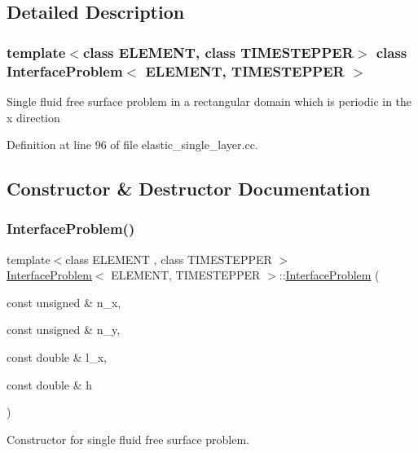 \subsection{Detailed Description}
\subsubsection*{template$<$class E\+L\+E\+M\+E\+NT, class T\+I\+M\+E\+S\+T\+E\+P\+P\+ER$>$\newline
class Interface\+Problem$<$ E\+L\+E\+M\+E\+N\+T, T\+I\+M\+E\+S\+T\+E\+P\+P\+E\+R $>$}

Single fluid free surface problem in a rectangular domain which is periodic in the x direction 

Definition at line 96 of file elastic\+\_\+single\+\_\+layer.\+cc.



\subsection{Constructor \& Destructor Documentation}
\mbox{\label{classInterfaceProblem_a83023535d663a2a6558959f36bf6e1e7}} 
\subsubsection{\texorpdfstring{Interface\+Problem()}{InterfaceProblem()}\hspace{0.1cm}{\footnotesize\ttfamily [1/2]}}
{\footnotesize\ttfamily template$<$class E\+L\+E\+M\+E\+NT , class T\+I\+M\+E\+S\+T\+E\+P\+P\+ER $>$ \\
\hyperlink{classInterfaceProblem}{Interface\+Problem}$<$ E\+L\+E\+M\+E\+NT, T\+I\+M\+E\+S\+T\+E\+P\+P\+ER $>$\+::\hyperlink{classInterfaceProblem}{Interface\+Problem} (\begin{DoxyParamCaption}\item[{const unsigned \&}]{n\+\_\+x,  }\item[{const unsigned \&}]{n\+\_\+y,  }\item[{const double \&}]{l\+\_\+x,  }\item[{const double \&}]{h }\end{DoxyParamCaption})}



Constructor for single fluid free surface problem. 

